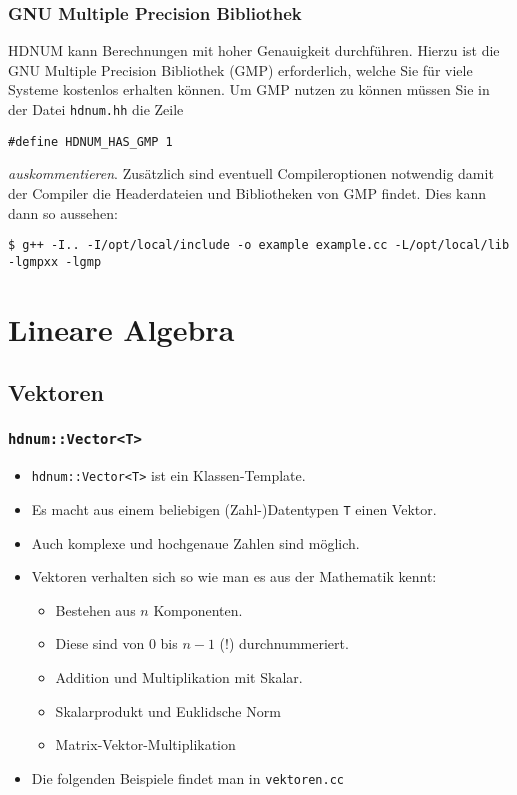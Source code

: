 \documentclass[a4paper,11pt]{article}
\theoremstyle{definition}
\begin{document}
\subsubsection*{GNU Multiple Precision Bibliothek}

HDNUM kann Berechnungen mit hoher Genauigkeit durchführen. Hierzu ist die GNU Multiple Precision
Bibliothek (GMP) erforderlich,
welche Sie für viele Systeme kostenlos erhalten können. Um GMP nutzen zu können müssen
Sie in der Datei \lstinline{hdnum.hh} die Zeile
\begin{lstlisting}[basicstyle=\ttfamily\small,frame=single]
#define HDNUM_HAS_GMP 1
\end{lstlisting}
\textit{auskommentieren}. Zusätzlich sind eventuell Compileroptionen notwendig damit der Compiler
die Headerdateien und Bibliotheken von GMP findet. Dies kann dann so aussehen:
\begin{lstlisting}[basicstyle=\ttfamily\footnotesize,frame=single]
$ g++ -I.. -I/opt/local/include -o example example.cc -L/opt/local/lib -lgmpxx -lgmp
\end{lstlisting}

\section{Lineare Algebra}

\subsection{Vektoren}

\begin{frame}[fragile]
\frametitle{\lstinline{hdnum::Vector<T>}}
\begin{itemize}
\item \lstinline{hdnum::Vector<T>} ist ein Klassen-Template.
\item Es macht aus einem beliebigen (Zahl-)Datentypen \lstinline{T}
  einen Vektor.
\item Auch komplexe und hochgenaue Zahlen sind möglich.
\item Vektoren verhalten sich so wie man es aus der Mathematik kennt:
\begin{itemize}
\item Bestehen aus $n$ Komponenten.
\item Diese sind von $0$ bis $n-1$ (!) durchnummeriert.
\item Addition und Multiplikation mit Skalar.
\item Skalarprodukt und Euklidsche Norm
\item Matrix-Vektor-Multiplikation
\end{itemize}
\item Die folgenden Beispiele findet man in \lstinline{vektoren.cc}
\end{itemize}
\end{frame}
\end{document}
